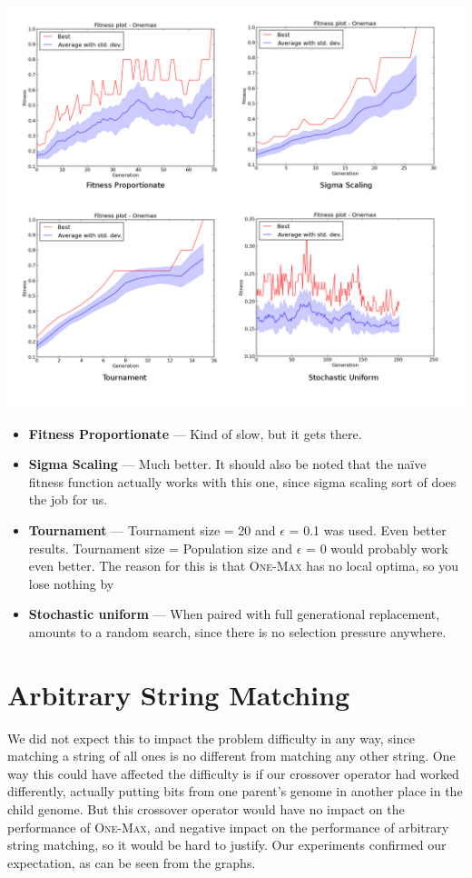 \documentclass[a4paper,12pt]{article}
\begin{document}
\centerline{\includegraphics[width=1.2\textwidth]{graph_bundle_2}}

\begin{itemize}
\item{\textbf{Fitness Proportionate} --- Kind of slow, but it gets there.}
\item{\textbf{Sigma Scaling} --- Much better. It should also be noted that the na\"{i}ve fitness function actually works with this one, since sigma scaling sort of does the job for us.}
\item{\textbf{Tournament} --- Tournament size = 20 and $\epsilon$ = 0.1 was used. Even better results. Tournament size = Population size and $\epsilon$ = 0 would probably work even better. The reason for this is that \textsc{One-Max} has no local optima, so you lose nothing by }
\item{\textbf{Stochastic uniform} --- When paired with full generational replacement, amounts to a random search, since there is no selection pressure anywhere.}
\end{itemize}

\section{Arbitrary String Matching}
We did not expect this to impact the problem difficulty in any way, since matching a string of all ones is no different from matching any other string. One way this could have affected the difficulty is if our crossover operator had worked differently, actually putting bits from one parent's genome in another place in the child genome. But this crossover operator would have no impact on the performance of \textsc{One-Max}, and negative impact on the performance of arbitrary string matching, so it would be hard to justify. Our experiments confirmed our expectation, as can be seen from the graphs.
\end{document}
